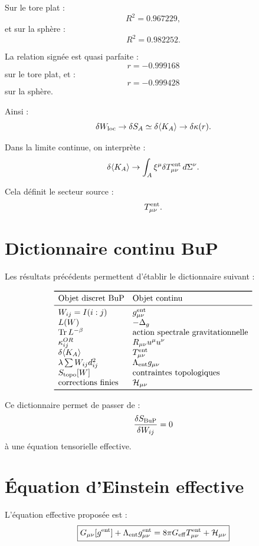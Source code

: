 \documentclass[11pt,a4paper]{article}
\begin{document}
Sur le tore plat :
\[
R^2=0.967229,
\]
et sur la sphère :
\[
R^2=0.982252.
\]

La relation signée est quasi parfaite :
\[
r=-0.999168
\]
sur le tore plat, et :
\[
r=-0.999428
\]
sur la sphère.

Ainsi :
\[
\delta W_{\rm loc}
\to
\delta S_A
\simeq
\delta\langle K_A\rangle
\to
\delta\kappa(r).
\]

Dans la limite continue, on interprète :
\[
\delta\langle K_A\rangle
\to
\int_A \xi^\mu\delta T_{\mu\nu}^{\rm ent}\,d\Sigma^\nu.
\]

Cela définit le secteur source :
\[
T_{\mu\nu}^{\rm ent}.
\]

\section{Dictionnaire continu BuP}

Les résultats précédents permettent d'établir le dictionnaire suivant :

\[
\begin{array}{ll}
\toprule
{\rm Objet\ discret\ BuP} & {\rm Objet\ continu}\\
\midrule
W_{ij}=I(i:j) & g_{\mu\nu}^{\rm ent}\\
L(W) & -\Delta_g\\
\mathrm{Tr}\,L^{-\beta} & {\rm action\ spectrale\ gravitationnelle}\\
\kappa_{ij}^{OR} & R_{\mu\nu}u^\mu u^\nu\\
\delta\langle K_A\rangle & T_{\mu\nu}^{\rm ent}\\
\lambda\sum W_{ij}d_{ij}^2 & \Lambda_{\rm ent}g_{\mu\nu}\\
S_{\rm topo}[W] & {\rm contraintes\ topologiques}\\
{\rm corrections\ finies} & \mathcal{H}_{\mu\nu}\\
\bottomrule
\end{array}
\]

Ce dictionnaire permet de passer de :
\[
\frac{\delta S_{\rm BuP}}{\delta W_{ij}}=0
\]
à une équation tensorielle effective.

\section{Équation d'Einstein effective}

L'équation effective proposée est :
\[
\boxed{
G_{\mu\nu}[g^{\rm ent}]
+
\Lambda_{\rm ent}g_{\mu\nu}^{\rm ent}
=
8\pi G_{\rm eff}T_{\mu\nu}^{\rm ent}
+
\mathcal{H}_{\mu\nu}
}
\]
\end{document}
